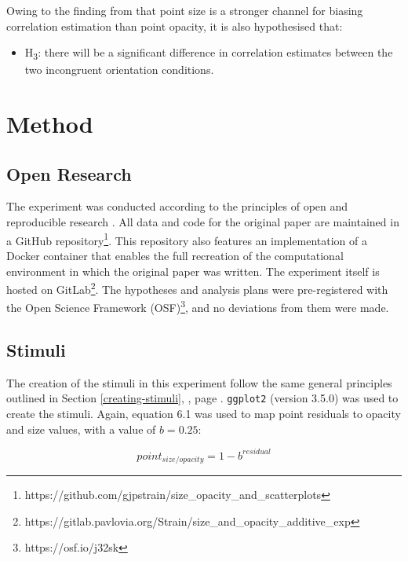 \documentclass[../main.tex]{subfiles}
\begin{document}
Owing to the finding from  that point size is
a stronger channel for biasing correlation estimation than point
opacity, it is also hypothesised that:

\begin{itemize}
\tightlist
\item
  H\textsubscript{3}: there will be a significant difference in
  correlation estimates between the two incongruent orientation
  conditions.
\end{itemize}

\section{Method}\label{method-e4}

\subsection{Open Research}\label{open-research-chap6}

The experiment was conducted according to the principles of open and
reproducible research \cite{ayris_2018}. All data and code for the
original paper are maintained in a GitHub repository\footnote{https://github.com/gjpstrain/size\_opacity\_and\_scatterplots}.
This repository also features an implementation of a Docker container
that enables the full recreation of the computational environment in
which the original paper was written. The experiment itself is hosted on
GitLab\footnote{https://gitlab.pavlovia.org/Strain/size\_and\_opacity\_additive\_exp}.
The hypotheses and analysis plans were pre-registered with the Open
Science Framework (OSF)\footnote{https://osf.io/j32sk}, and no
deviations from them were made.

\subsection{Stimuli}\label{stimuli-e4}

The creation of the stimuli in this experiment follow the same general
principles outlined in Section \ref{creating-stimuli},
, page \pageref{creating-stimuli}.
\texttt{ggplot2} (version 3.5.0) was used to create the stimuli. Again,
equation 6.1 was used to map point residuals to opacity and size values,
with a value of \(b = 0.25\):

\begin{equation}
  point_{size/opacity} = 1 - b^{residual}
\end{equation}
\end{document}

